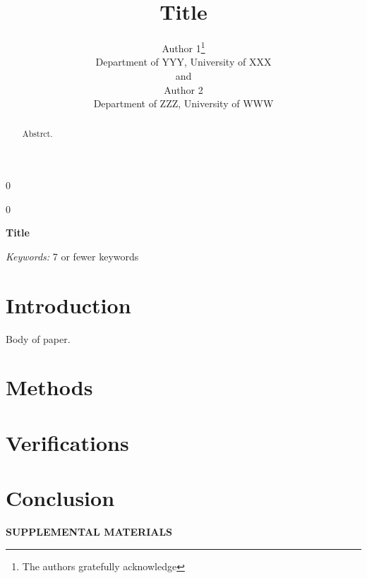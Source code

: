 \documentclass[12pt]{article}
\newcommand{\blind}{0}
\begin{document}
%

\def\spacingset#1{\renewcommand{\baselinestretch}%
{#1}\small\normalsize} \spacingset{1}



\blind
{
  \title{\bf Title}
  \author{Author 1\thanks{
    The authors gratefully acknowledge}\hspace{.2cm}\\
    Department of YYY, University of XXX\\
    and \\
    Author 2 \\
    Department of ZZZ, University of WWW}
  \maketitle
} \fi

\blind
{
  \bigskip
  \bigskip
  \bigskip
  \begin{center}
    {\LARGE\bf Title}
\end{center}
  \medskip
} \fi

\bigskip
\begin{abstract}
Abstrct.
\end{abstract}

\noindent%
{\it Keywords:}  7 or fewer keywords

\spacingset{1.45}
\section{Introduction}
\label{sec:intro}

Body of paper.

\section{Methods}
\label{sec:meth}

\section{Verifications}
\label{sec:verify}

\section{Conclusion}
\label{sec:conc}


\bigskip
\begin{center}
{\large\bf SUPPLEMENTAL MATERIALS}
\end{center}
\end{document}
